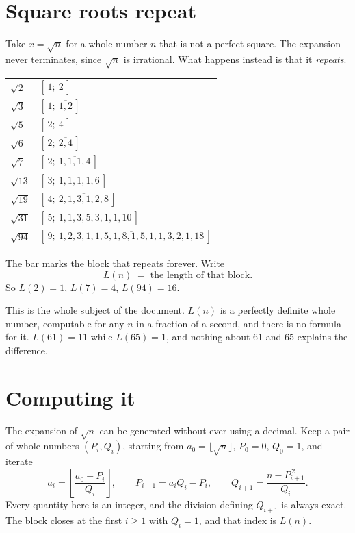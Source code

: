 \documentclass[12pt,a4paper]{article}
\begin{document}
\section{Square roots repeat}

Take $x = \sqrt{n}$ for a whole number $n$ that is not a perfect square. The expansion never terminates, since $\sqrt n$ is irrational. What happens instead is that it \emph{repeats}.

\begin{center}
\begin{tabular}{ll}
\toprule
$\sqrt{2}$  & $[\,1;\ \overline{2}\,]$ \\
$\sqrt{3}$  & $[\,1;\ \overline{1,2}\,]$ \\
$\sqrt{5}$  & $[\,2;\ \overline{4}\,]$ \\
$\sqrt{6}$  & $[\,2;\ \overline{2,4}\,]$ \\
$\sqrt{7}$  & $[\,2;\ \overline{1,1,1,4}\,]$ \\
$\sqrt{13}$ & $[\,3;\ \overline{1,1,1,1,6}\,]$ \\
$\sqrt{19}$ & $[\,4;\ \overline{2,1,3,1,2,8}\,]$ \\
$\sqrt{31}$ & $[\,5;\ \overline{1,1,3,5,3,1,1,10}\,]$ \\
$\sqrt{94}$ & $[\,9;\ \overline{1,2,3,1,1,5,1,8,1,5,1,1,3,2,1,18}\,]$ \\
\bottomrule
\end{tabular}
\end{center}

The bar marks the block that repeats forever. Write
\[
  L(n) \;=\; \text{the length of that block.}
\]
So $L(2)=1$, $L(7)=4$, $L(94)=16$.

This is the whole subject of the document. $L(n)$ is a perfectly definite whole number, computable for any $n$ in a fraction of a second, and there is no formula for it. $L(61) = 11$ while $L(65) = 1$, and nothing about $61$ and $65$ explains the difference.

\section{Computing it}

The expansion of $\sqrt n$ can be generated without ever using a decimal. Keep a pair of whole numbers $(P_i, Q_i)$, starting from $a_0 = \lfloor \sqrt n \rfloor$, $P_0 = 0$, $Q_0 = 1$, and iterate
\[
  a_i = \left\lfloor \frac{a_0 + P_i}{Q_i} \right\rfloor,
  \qquad
  P_{i+1} = a_i Q_i - P_i,
  \qquad
  Q_{i+1} = \frac{n - P_{i+1}^{\,2}}{Q_i} .
\]
Every quantity here is an integer, and the division defining $Q_{i+1}$ is always exact. The block closes at the first $i \geq 1$ with $Q_i = 1$, and that index is $L(n)$.
\end{document}
